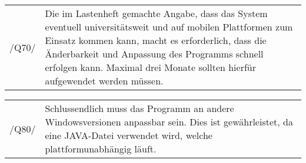 \begin{tabular}{p{1.5cm}p{14.5cm}}
 /Q70/	& Die im Lastenheft gemachte Angabe, dass das System eventuell universitätsweit und auf mobilen Plattformen zum Einsatz kommen kann, macht es erforderlich, dass die Änderbarkeit und Anpassung des Programms schnell erfolgen kann. Maximal drei Monate sollten hierfür aufgewendet werden müssen. \\[0.25cm]	 
\end{tabular}
 
\begin{tabular}{p{1.5cm}p{14.5cm}}
 /Q80/	& Schlussendlich muss das Programm an andere Windowsversionen anpassbar sein. Dies ist gewährleistet, da eine JAVA-Datei verwendet wird, welche plattformunabhängig läuft. \\[0.25cm]	 
\end{tabular} 
 